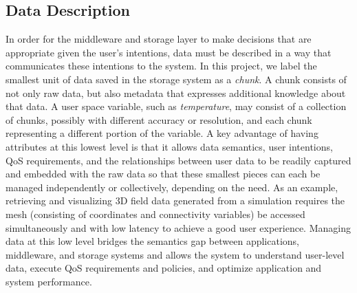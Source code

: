 \subsection{Data Description}
\label{sec:data-description}
In order for the middleware and storage layer to make decisions
that are appropriate given the user's intentions, data must be
described in a way that communicates these intentions to
the system. In this project, we label the smallest unit of data
saved in the storage system as a \textit{chunk}.  A chunk consists of not only
raw data, but also metadata that expresses additional
knowledge about that data.
A user space variable, such as \textit{temperature}, may
consist of a collection of chunks, possibly with different accuracy or
resolution, and each chunk representing
a different portion of the variable.
A key advantage of having attributes at this lowest level is that it allows data
semantics, user intentions, QoS requirements, and the relationships between user
data to be readily captured and embedded with the raw data so that these
smallest pieces can each be managed independently or collectively, depending on
the need. As an example, retrieving and visualizing 3D field data generated from a simulation
requires the mesh (consisting of coordinates and connectivity variables) be
accessed simultaneously and with low latency to achieve a good user experience.
Managing data at this low level
bridges the semantics gap between applications, middleware, and storage
systems and allows the system to understand user-level data, execute QoS
requirements and policies, and optimize application and system performance.


